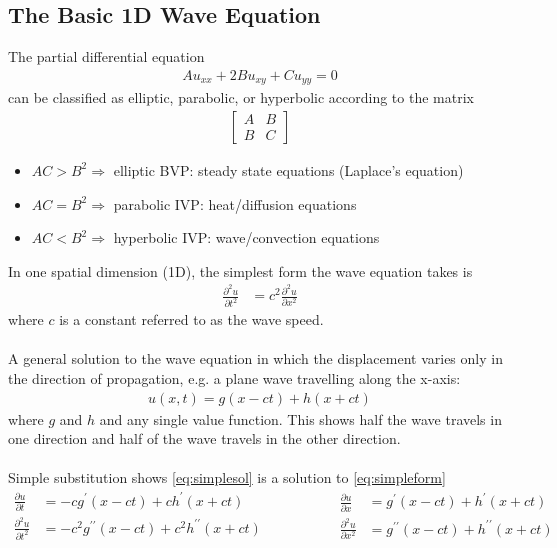 \documentclass[conf]{new-aiaa}
\begin{document}
\subsection{The Basic 1D Wave Equation}
The partial differential equation
\begin{align}
    Au_{xx}+2Bu_{xy}+Cu_{yy} =0
\end{align}
can be classified as elliptic, parabolic, or hyperbolic according to the matrix
\begin{align*}
    \begin{bmatrix}
    A & B\\
    B & C
    \end{bmatrix}
\end{align*}
\begin{itemize}
    \item $AC > B^2\Longrightarrow$
    elliptic BVP: steady state equations (Laplace's equation)
    \item $AC = B^2\Longrightarrow$
    parabolic IVP: heat/diffusion equations
    \item $AC < B^2\Longrightarrow$
    hyperbolic IVP: wave/convection equations
\end{itemize}
In one spatial dimension (1D), the simplest form the wave equation takes is
\begin{align}
    \frac{\partial^2 u}{\partial t^2} &= c^2 \frac{\partial^2 u}{\partial x^2} \label{eq:simpleform}
\end{align}
where $c$ is a constant referred to as the wave speed.\\ \\
A general solution to the wave equation in which the displacement varies only in the direction of propagation, e.g. a plane wave travelling along the x-axis:
\begin{align}
    u(x,t)= g(x - ct) + h (x + ct) \label{eq:simplesol}
\end{align}
where $g$ and $h$ and any single value function. This shows half the wave travels in one direction and half of the wave travels in the other direction.\\ \\
Simple substitution shows \cref{eq:simplesol} is a solution to \cref{eq:simpleform}
\begin{equation*}
    \begin{split}
        \frac{\partial u}{\partial t} &= -cg^\prime(x-ct) + ch^\prime(x+ct)\\
        \frac{\partial^2 u}{\partial t^2} &= -c^2g^{\prime\prime}(x-ct) + c^2h^{\prime\prime}(x+ct)\\
    \end{split}
    \hspace{2cm}
    \begin{split}
        \frac{\partial u}{\partial x} &= g^\prime (x-ct) + h^\prime(x+ct)\\
        \frac{\partial^2 u}{\partial x^2} &= g^{\prime\prime} (x-ct) + h^{\prime\prime}(x+ct)\\
    \end{split}
\end{equation*}
\end{document}

